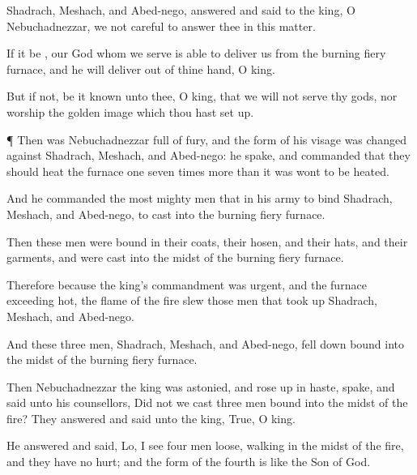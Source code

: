 {Shadrach,
Meshach, and
Abed-nego,
answered and
said to the
king, O
Nebuchadnezzar,
we
{}
not
careful to
answer thee
in
this
matter.

If it be
{}, our
God whom
we
serve
is
able to
deliver us
from the
burning
fiery
furnace,
and he will
deliver
{} out
of thine
hand, O
king.

But
if
not, be
it
known unto thee, O
king, that we
will
not
serve thy
gods,
nor
worship the
golden
image which thou hast set
up.


\par }{\PP {}¶
Then was
Nebuchadnezzar
full of
fury, and the
form of his
visage was
changed
against
Shadrach,
Meshach, and
Abed-nego:
{} he
spake, and
commanded that they should
heat the
furnace
one seven
times
more
than it was
wont to be
heated.

And he
commanded the
most
mighty
men that
{} in his
army to
bind
Shadrach,
Meshach, and
Abed-nego,
{} to
cast
{} into the
burning
fiery
furnace.

Then
these
men were
bound in their
coats, their
hosen, and their
hats, and their
{}
garments, and were
cast into the
midst of the
burning
fiery
furnace.

Therefore
because the
king’s
commandment was
urgent, and the
furnace
exceeding
hot, the
flame of the
fire
slew
those
men that took
up
Shadrach,
Meshach, and
Abed-nego.

And
these
three
men,
Shadrach,
Meshach, and
Abed-nego, fell
down
bound into the
midst of the
burning
fiery
furnace.

Then
Nebuchadnezzar the
king was
astonied, and rose
up in
haste,
{}
spake, and
said unto his
counsellors, Did
not we
cast
three
men
bound into the
midst of the
fire? They
answered and
said unto the
king,
True, O
king.

He
answered and
said,
Lo,
I
see
four
men
loose,
walking in the
midst of the
fire, and they
have
no
hurt; and the
form of the
fourth is
like the
Son of
God.


}
